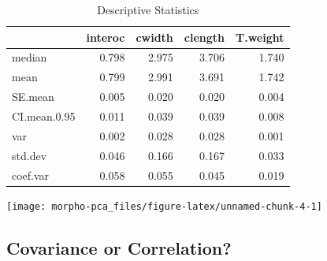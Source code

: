 \documentclass[]{article}
\newenvironment{Shaded}{\begin{snugshade}}{\end{snugshade}}
\newcommand{\CommentTok}[1]{\textcolor[rgb]{0.56,0.35,0.01}{\textit{#1}}}
\newcommand{\DataTypeTok}[1]{\textcolor[rgb]{0.13,0.29,0.53}{#1}}
\newcommand{\DecValTok}[1]{\textcolor[rgb]{0.00,0.00,0.81}{#1}}
\newcommand{\KeywordTok}[1]{\textcolor[rgb]{0.13,0.29,0.53}{\textbf{#1}}}
\newcommand{\NormalTok}[1]{#1}
\newcommand{\OperatorTok}[1]{\textcolor[rgb]{0.81,0.36,0.00}{\textbf{#1}}}
\newcommand{\OtherTok}[1]{\textcolor[rgb]{0.56,0.35,0.01}{#1}}
\newcommand{\StringTok}[1]{\textcolor[rgb]{0.31,0.60,0.02}{#1}}
\begin{document}
\begin{table}[t]

\caption{\label{tab:unnamed-chunk-3}Descriptive Statistics}
\centering
\begin{tabular}{l|r|r|r|r}
\hline
  & interoc & cwidth & clength & T.weight\\
\hline
median & 0.798 & 2.975 & 3.706 & 1.740\\
\hline
mean & 0.799 & 2.991 & 3.691 & 1.742\\
\hline
SE.mean & 0.005 & 0.020 & 0.020 & 0.004\\
\hline
CI.mean.0.95 & 0.011 & 0.039 & 0.039 & 0.008\\
\hline
var & 0.002 & 0.028 & 0.028 & 0.001\\
\hline
std.dev & 0.046 & 0.166 & 0.167 & 0.033\\
\hline
coef.var & 0.058 & 0.055 & 0.045 & 0.019\\
\hline
\end{tabular}
\end{table}

\begin{Shaded}
\end{Shaded}

\begin{center}\texttt{[image: morpho-pca\_files/figure-latex/unnamed-chunk-4-1]} \end{center}

\hypertarget{covariance-or-correlation}{%
\subsection{Covariance or
Correlation?}\label{covariance-or-correlation}}
\end{document}
